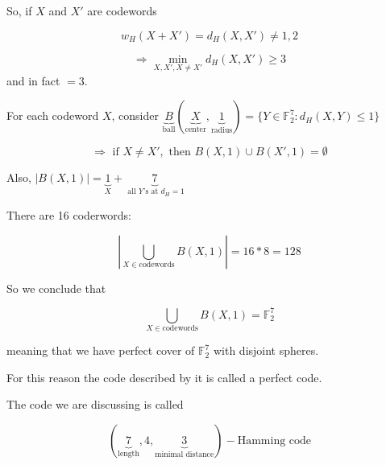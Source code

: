 \documentclass[twoside]{article}
\newtheorem{observation}{Observation}[section]
\theoremstyle{definition} %
\newtheorem{example}{Example}
\def\F{\mathbb{F}}
\begin{document}
So, if $X$ and $X'$ are codewords

\[
  w_H(X+X') = d_H(X, X') \neq 1,2
\]

\[
  \Rightarrow \min_{X, X', X \neq X'} d_H(X, X') \geq 3
\]
and in fact $ = 3$.

For each codeword $X$, consider $\underbrace{B}_{\text{ball}}(\underbrace{X}_{\text{center}}, \underbrace{1}_{\text{radius}}) = \{Y \in \F^7_2 : d_H(X, Y) \leq 1 \}$

\[
  \Rightarrow \text{ if } X \neq X', \text{ then } B(X, 1) \cup B(X', 1) = \emptyset
\]

Also, $|B(X, 1)| = \underbrace{1}_{X} + \underbrace{7}_{\text{ all } Y \text{'s at } d_H = 1}$

There are 16 coderwords:

\[
  | \bigcup_{X \in \text{codewords}} B(X, 1) | = 16 * 8 = 128
\]

So we conclude that

\[
  \bigcup_{X \in \text{codewords}} B(X, 1) = \F_2^7
\]

meaning that we have perfect cover of $\F_2^7$ with disjoint spheres.

For this reason the code described by it is called a perfect code.

The code we are discussing is called

\[
  (\underbrace{7}_{\text{length}}, 4, \underbrace{3}_{\text{minimal distance}})-\text{Hamming code}
\]






\end{document}
